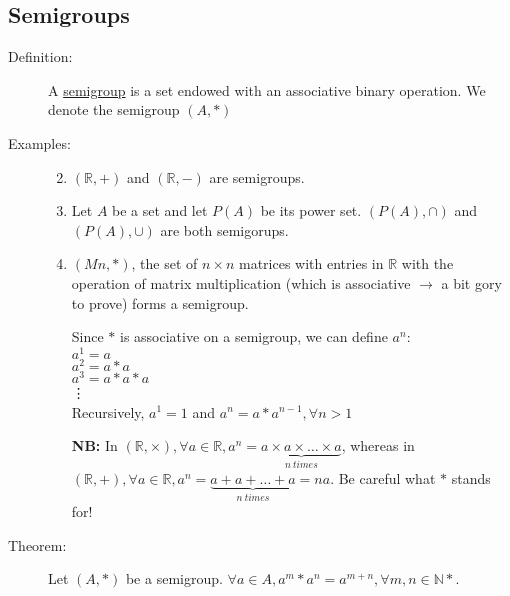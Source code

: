 \documentclass[10pt]{article}
\begin{document}
	\subsection{Semigroups}
	\begin{description}
		\item[Definition:] A \underline{semigroup} is a set endowed with an associative binary operation. We denote the semigroup $(A, *)$
		\item[Examples:]
		\begin{enumerate}
			\item[]
			\item $(\mathbb{R}, +)$ and $(\mathbb{R}, -)$ are semigroups.
			\item Let $A$ be a set and let $P(A)$ be its power set. $(P(A), \cap)$ and $(P(A), \cup)$ are both semigorups.
			\item $(Mn, *)$, the set of $n\times n$ matrices with entries in $\mathbb{R}$ with the operation of matrix multiplication (which is associative $\rightarrow$ a bit gory to prove) forms a semigroup.
			\item[] Since $*$ is associative on a semigroup, we can define $a^n:$\\
			$a^1 = a$ \\
			$a^2 = a*a$\\
			$a^3 = a*a*a$\\
			\vdots \\
			Recursively, $a^1=1$ and $a^n=a*a^{n-1}, \forall n > 1$
			\item[\textbf{NB:}] In $(\mathbb{R}, \times), \forall a \in \mathbb{R}, a^n = \underset{n\: times}{\underbrace{a \times a \times \dots \times a}}$, whereas in $(\mathbb{R}, +), \forall a \in \mathbb{R}, a^n = \underset{n\: times}{\underbrace{a + a + \dots + a}}=na$. Be careful what $*$ stands for!
		\end{enumerate}
		\item[Theorem:] Let $(A, *)$ be a semigroup. $\forall a \in A, a^m * a^n = a^{m+n}, \forall m, n \in \mathbb{N*}$.
\end{description}
\end{document}
